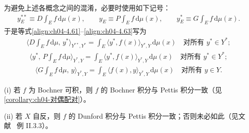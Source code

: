 \documentclass[../../main.tex]{subfiles}%
\begin{document}
为避免上述各概念之间的混淆，必要时使用如下记号：
\begin{align*}
y_E^{**}\equiv D\!\int_E f\,\mathrm{d}\mu(x),\qquad
y_E\equiv P\!\int_E f\,\mathrm{d}\mu(x),\qquad
y_E^*\equiv G\!\int_E f\,\mathrm{d}\mu(x).
\end{align*}
于是等式\eqref{align:ch04-4.61}--\eqref{align:ch04-4.63}写为
\begin{align}
\Big\langle D\!\int_E f\,\mathrm{d}\mu,\,y^*\Big\rangle_{Y^{**},Y^*}=\int_E\langle y^*,f(x)\rangle_{Y^*,Y}\,\mathrm{d}\mu(x)\quad\text{对所有 }y^*\in Y^*; \label{align:ch04-4.64a}
\end{align}
\begin{align}
\Big\langle y^*,\,P\!\int_E f\,\mathrm{d}\mu\Big\rangle_{Y^*,Y}=\int_E\langle y^*,f(x)\rangle_{Y^*,Y}\,\mathrm{d}\mu(x)\quad\text{对所有 }y^*\in Y^*; \label{align:ch04-4.64b}
\end{align}
\begin{align}
\Big\langle G\!\int_E f\,\mathrm{d}\mu,\,y\Big\rangle_{Y^*,Y}=\int_E\langle f(x),y\rangle_{Y^*,Y}\,\mathrm{d}\mu(x)\quad\text{对所有 }y\in Y. \label{align:ch04-4.64c}
\end{align}

\begin{remark}\label{remark:ch04-弱积分比较}
(i) 若 $f$ 为 Bochner 可积，则 $f$ 的 Bochner 积分与 Pettis 积分一致（见\cref{corollary:ch04-对偶配对}）。

(ii) 若 $X$ 自反，则 $f$ 的 Dunford 积分与 Pettis 积分一致；否则未必如此（见文献~\cite{ref41} 例 II.3.3）。
\end{remark}
\end{document}
